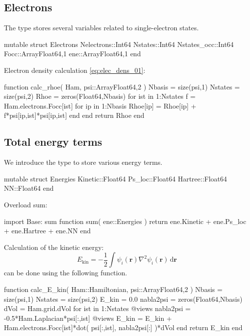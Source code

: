 \subsection{Electrons}

The type  stores several variables related to single-electron states.
\begin{juliacode}
mutable struct Electrons
  Nelectrons::Int64
  Nstates::Int64
  Nstates_occ::Int64
  Focc::Array{Float64,1}
  ene::Array{Float64,1}
end
\end{juliacode}

Electron density calculation \ref{eq:elec_dens_01}:

\begin{juliacode}
function calc_rhoe( Ham, psi::Array{Float64,2} )
  Nbasis = size(psi,1)
  Nstates = size(psi,2)
  Rhoe = zeros(Float64,Nbasis)
  for ist in 1:Nstates
    f = Ham.electrons.Focc[ist]
    for ip in 1:Nbasis
      Rhoe[ip] = Rhoe[ip] + f*psi[ip,ist]*psi[ip,ist]
    end
  end
  return Rhoe
end
\end{juliacode}


\subsection{Total energy terms}

We introduce the  type to store various energy terms.
\begin{juliacode}
mutable struct Energies
  Kinetic::Float64
  Ps_loc::Float64
  Hartree::Float64
  NN::Float64
end
\end{juliacode}

Overload sum:
\begin{juliacode}
import Base: sum
function sum( ene::Energies )
  return ene.Kinetic + ene.Ps_loc + ene.Hartree + ene.NN
end
\end{juliacode}

Calculation of the kinetic energy:
\begin{equation}
E_{\mathrm{kin}} =
-\frac{1}{2} \int \psi_{i}(\mathbf{r}) \nabla^{2} \psi_{i}(\mathbf{r})\,\mathrm{d}\mathbf{r}
\end{equation}
can be done using the following function.
\begin{juliacode}
function calc_E_kin( Ham::Hamiltonian, psi::Array{Float64,2} )
  Nbasis = size(psi,1)
  Nstates = size(psi,2)
  E_kin = 0.0
  nabla2psi = zeros(Float64,Nbasis)
  dVol = Ham.grid.dVol
  for ist in 1:Nstates
    @views nabla2psi = -0.5*Ham.Laplacian*psi[:,ist]
    @views E_kin = E_kin + Ham.electrons.Focc[ist]*dot( psi[:,ist], nabla2psi[:] )*dVol
  end
  return E_kin
end
\end{juliacode}

